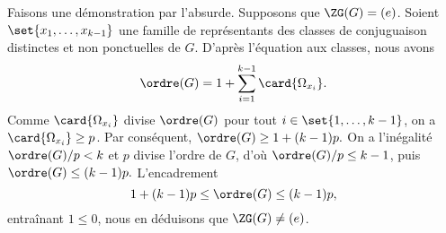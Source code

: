Faisons une démonstration par l'absurde.
Supposons que $\ZG(G) = (e)$.
Soient $\set{x_1,\dots,x_{k - 1}}$ une famille de représentants des classes de conjuguaison distinctes et non ponctuelles de $G$.
D'après l'équation aux classes, nous avons
\[
  \ordre(G) = 1 + \sum_{i = 1}^{k - 1} \card{\Omega_{x_i}}.
\]
Comme $\card{\Omega_{x_i}}$ divise $\ordre(G)$ pour tout $i\in\set{1,\dots,k - 1}$, on a $\card{\Omega_{x_i}} \geq p$.
Par conséquent,
$
  \ordre(G) \geq 1 + (k - 1)p.
$
On a l'inégalité $\ordre(G) / p < k$ et $p$ divise l'ordre de $G$, d'où $\ordre(G) / p \leq k - 1$, puis 
$
  \ordre(G) \leq (k - 1)p.
$
L'encadrement 
\[
  1 + (k - 1)p \leq \ordre(G) \leq (k - 1)p,
\]
entraînant $1 \leq 0$, nous en déduisons que $\ZG(G) \neq (e)$.
